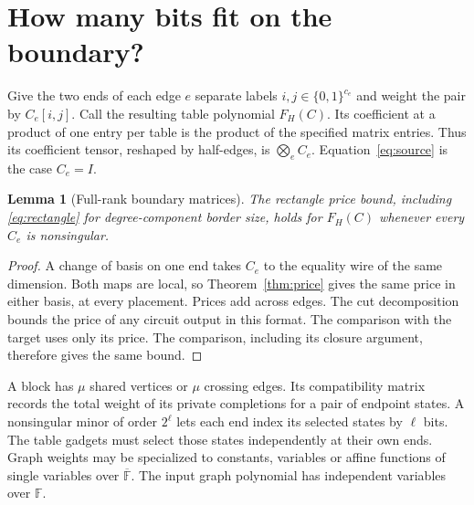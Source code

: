 \documentclass[11pt]{article}
\newtheorem{lemma}[theorem]{Lemma}
\theoremstyle{definition}
\newcommand{\F}{\mathbb F}
\newcommand{\bits}{\{0,1\}}
\newcommand{\olF}{\overline{\F}}
\begin{document}
\section{How many bits fit on the boundary?}\label{sec:transfer}

Give the two ends of each edge \(e\) separate labels \(i,j\in\bits^{c_e}\) and weight the pair by \(C_e[i,j]\). Call the resulting table polynomial \(F_H(C)\). Its coefficient at a product of one entry per table is the product of the specified matrix entries. Thus its coefficient tensor, reshaped by half-edges, is \(\bigotimes_e C_e\). Equation~\eqref{eq:source} is the case \(C_e=I\).

\begin{lemma}[Full-rank boundary matrices]\label{lem:physical}
The rectangle price bound, including \eqref{eq:rectangle} for degree-component border size, holds for \(F_H(C)\) whenever every \(C_e\) is nonsingular.
\end{lemma}
\begin{proof}
A change of basis on one end takes \(C_e\) to the equality wire of the same dimension. Both maps are local, so Theorem~\ref{thm:price} gives the same price in either basis, at every placement. Prices add across edges. The cut decomposition bounds the price of any circuit output in this format. The comparison with the target uses only its price. The comparison, including its closure argument, therefore gives the same bound.
\end{proof}

A block has \(\mu\) shared vertices or \(\mu\) crossing edges. Its compatibility matrix records the total weight of its private completions for a pair of endpoint states. A nonsingular minor of order \(2^\ell\) lets each end index its selected states by \(\ell\) bits. The table gadgets must select those states independently at their own ends. Graph weights may be specialized to constants, variables or affine functions of single variables over \(\olF\). The input graph polynomial has independent variables over \(\F\).
\end{document}
